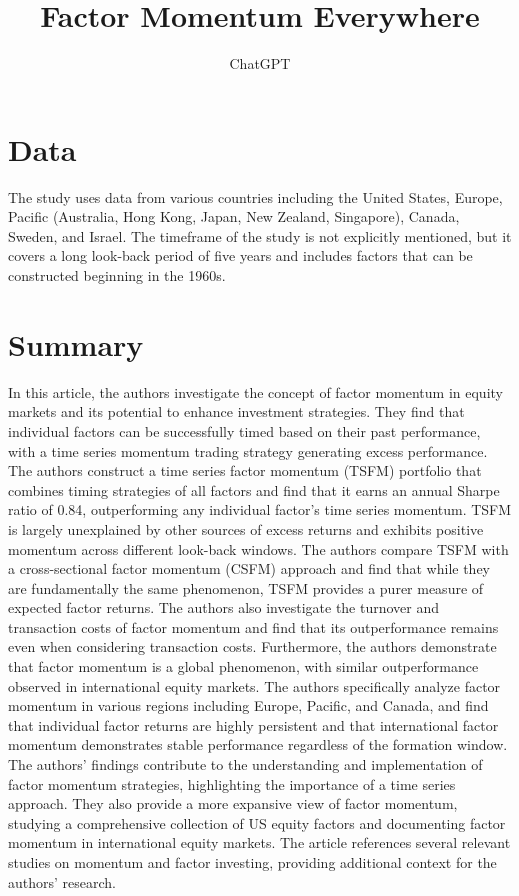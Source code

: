 \documentclass{article}
\title{Factor Momentum Everywhere}
\author{ChatGPT}
\begin{document}
 

\maketitle
\section{Data}
The study uses data from various countries including the United States, Europe, Pacific (Australia, Hong Kong, Japan, New Zealand, Singapore), Canada, Sweden, and Israel. The timeframe of the study is not explicitly mentioned, but it covers a long look-back period of five years and includes factors that can be constructed beginning in the 1960s. 
\section{Summary}
In this article, the authors investigate the concept of factor momentum in equity markets and its potential to enhance investment strategies. They find that individual factors can be successfully timed based on their past performance, with a time series momentum trading strategy generating excess performance. The authors construct a time series factor momentum (TSFM) portfolio that combines timing strategies of all factors and find that it earns an annual Sharpe ratio of 0.84, outperforming any individual factor's time series momentum. TSFM is largely unexplained by other sources of excess returns and exhibits positive momentum across different look-back windows. The authors compare TSFM with a cross-sectional factor momentum (CSFM) approach and find that while they are fundamentally the same phenomenon, TSFM provides a purer measure of expected factor returns. The authors also investigate the turnover and transaction costs of factor momentum and find that its outperformance remains even when considering transaction costs. Furthermore, the authors demonstrate that factor momentum is a global phenomenon, with similar outperformance observed in international equity markets. The authors specifically analyze factor momentum in various regions including Europe, Pacific, and Canada, and find that individual factor returns are highly persistent and that international factor momentum demonstrates stable performance regardless of the formation window. The authors' findings contribute to the understanding and implementation of factor momentum strategies, highlighting the importance of a time series approach. They also provide a more expansive view of factor momentum, studying a comprehensive collection of US equity factors and documenting factor momentum in international equity markets. The article references several relevant studies on momentum and factor investing, providing additional context for the authors' research. 
\end{document}
